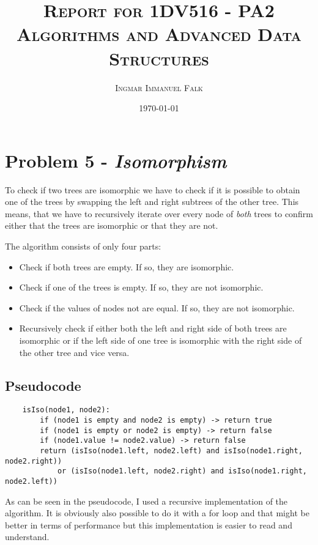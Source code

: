 \documentclass{article}
\title{\textsc{Report for 1DV516 - PA2\\\large{Algorithms and Advanced Data Structures}}}
\author{\textsc{Ingmar Immanuel Falk}}
\date{\textsc{\today}}
\begin{document}
\maketitle
\pagebreak

\section{Problem 5 - \textit{Isomorphism}}

To check if two trees are isomorphic we have to check if it is possible to obtain
one of the trees by swapping the left and right subtrees of the other tree. This means,
that we have to recursively iterate over every node of \emph{both} trees to confirm
either that the trees are isomorphic or that they are not.

The algorithm consists of only four parts:
\begin{itemize}
    \item Check if both trees are empty. If so, they are isomorphic.
    \item Check if one of the trees is empty. If so, they are not isomorphic.
    \item Check if the values of nodes not are equal. If so, they are not isomorphic.
    \item Recursively check if either both the left and right side of both trees are 
    isomorphic or if the left side of one tree is isomorphic with the right side of the other tree and vice versa.
\end{itemize}

\subsection{Pseudocode}

\begin{verbatim}
    isIso(node1, node2):
        if (node1 is empty and node2 is empty) -> return true
        if (node1 is empty or node2 is empty) -> return false
        if (node1.value != node2.value) -> return false
        return (isIso(node1.left, node2.left) and isIso(node1.right, node2.right)) 
            or (isIso(node1.left, node2.right) and isIso(node1.right, node2.left))
\end{verbatim}

As can be seen in the pseudocode, I used a recursive implementation of the
algorithm. It is obviously also possible to do it with a for loop and that might
be better in terms of performance but this implementation is easier to read and
understand.
\end{document}
